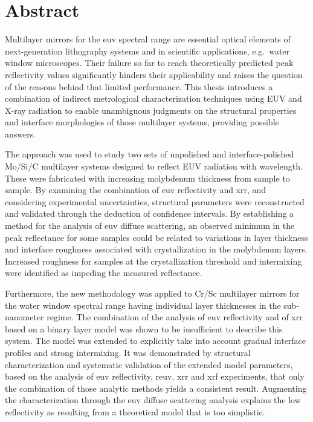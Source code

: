 \section*{Abstract}

\thispagestyle{empty}

Multilayer mirrors for the \gls{euv} spectral range are essential optical
elements of next-generation lithography systems and in scientific applications,
e.g.~water window microscopes.
Their failure so far to reach theoretically predicted peak reflectivity values
significantly hinders their applicability and raises the question of the reasons
behind that limited performance.
This thesis introduces a combination of indirect metrological characterization
techniques using EUV and X-ray radiation to enable unambiguous judgments on the
structural properties and interface morphologies of those multilayer systems,
providing possible answers.

The approach was used to study two sets of unpolished and interface-polished
Mo/Si/C multilayer systems designed to reflect EUV radiation with 
wavelength.
These were %
fabricated with increasing molybdenum thickness from sample to sample.
By examining the combination of \gls{euv} reflectivity and \gls{xrr}, and
considering experimental uncertainties, structural parameters were reconstructed
and validated through the deduction of confidence intervals.
By establishing a method for the analysis of \gls{euv} diffuse scattering, an
observed minimum in the peak reflectance for some samples could be related to
variations in layer thickness and interface roughness associated with
crystallization in the molybdenum layers.
Increased roughness for samples at the crystallization threshold and intermixing
were identified as impeding the measured reflectance.

Furthermore, the new methodology was applied to Cr/Sc multilayer mirrors for the
water window spectral range having individual layer thicknesses in the
sub-nanometer regime.
The combination of the analysis of \gls{euv} reflectivity and of \gls{xrr} based
on a binary layer model was shown to be insufficient to describe this system.
The model was extended to explicitly take into account gradual interface
profiles and strong intermixing.
It was demonstrated by structural characterization and systematic validation of
the extended model parameters, based on the analysis of \gls{euv} reflectivity,
\gls{reuv}, \gls{xrr} and \gls{xrf} experiments, that only the combination of
those analytic methods yields a consistent result.
Augmenting the characterization through the \gls{euv} diffuse scattering
analysis explains the low reflectivity as resulting from a theoretical model
that is too simplistic.

